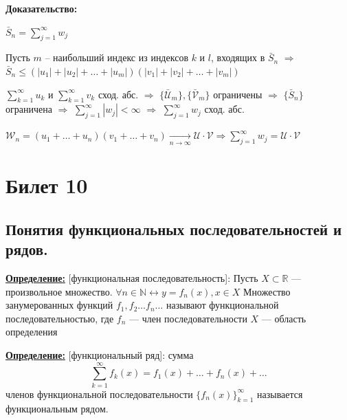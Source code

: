 \documentclass[a4paper,12pt]{article} %
\newcommand{\series}{\sum\limits_{k=1}^{\infty}}
\newcommand{\useries}{\sum\limits_{k=1}^{\infty} u_k}
\begin{document}
\textbf{Доказательство:}

$\bar{S}_n = \sum\limits_{j=1}^{\infty} w_j$

Пусть $m$ -- наибольший индекс из индексов $k$ и $l$, входящих в $\bar{S}_n$ $\Rightarrow$ $\bar{S}_n \leqslant (|u_1| + |u_2| + \ldots + |u_m|)(|v_1| + |v_2| + \ldots + |v_m|)$

$\useries$ и $\series v_k$ сход. абс. $\Rightarrow$ $\{ \bar{\mathscr{U}}_m \}, \{ \bar{\mathscr{V}}_m \}$ ограничены $\Rightarrow$ $\{\bar{S}_n\}$ ограничена $\Rightarrow$ $\sum\limits_{j=1}^{\infty} |w_j| < \infty$ $\Rightarrow$ $\sum\limits_{j=1}^{\infty} w_j$ сход. абс.

$\mathscr{W}_n = (u_1 + \ldots + u_n)(v_1 + \ldots + v_n) \xrightarrow[n \to \infty]{} \mathscr{U} \cdot \mathscr{V} \Rightarrow \sum\limits_{j=1}^{\infty} w_j = \mathscr{U} \cdot \mathscr{V}$


\newpage
\section{Билет 10}

\subsection{Понятия функциональных последовательностей и рядов.}

\underline{\textbf{Определение:}} [функциональная последовательность]:\newline
Пусть $X \subset \mathds{R}$ --- произвольное множество. \newline
\hspace*{5mm}$\forall n \in \mathds{N} \leftrightarrow y = f_n(x), x \in X$ \newline 
Множество занумерованных функций $f_1, f_2 \dots f_n \dots $ называют функциональной последовательностью, где  \newline
\hspace*{50mm}$f_n$ --- член последовательности \newline
 \hspace*{50mm}   $X$ --- область определения 
\newline \newline

\underline{\textbf{Определение:}} [функциональный ряд]:\newline
сумма $${\sum\limits_{k = 1}^{\infty}}  f_k(x) = f_1(x) + \dots + f_n(x) + \dots$$ \newline членов функциональной последовательности $\{f_n(x)\}_{k=1}^\infty$ называется функциональным рядом.
\newline
\end{document}
